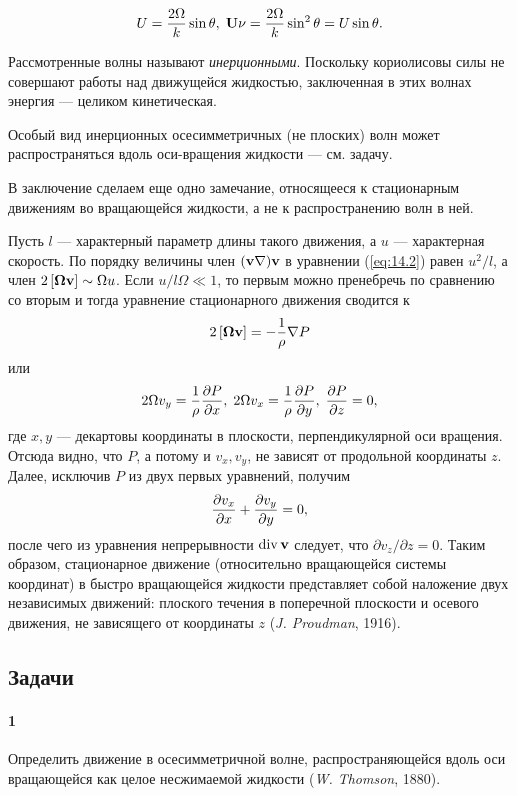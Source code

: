 \[
   U = \frac{2\Omega}{k}\sin\theta,\;
   \mathbf{U} \nu = \frac{2\Omega}{k}\sin^2\theta = U\sin\theta.
\]

Рассмотренные волны называют \textit{инерционными}. Поскольку кориолисовы силы
не совершают работы над движущейся жидкостью, заключенная в этих волнах энергия
— целиком кинетическая.

Особый вид инерционных осесимметричных (не плоских) волн может распространяться
вдоль оси-вращения жидкости — см. задачу.

В заключение сделаем еще одно замечание, относящееся к стационарным движениям во
вращающейся жидкости, а не к распространению волн в ней.

Пусть $l$ — характерный параметр длины такого движения, а $u$ — характерная
скорость. По порядку величины член $({\mathbf{v}} \nabla) {\mathbf{v}}$ в уравнении (\ref{eq:14.2}) равен $u^2/l$, а
член $2 \left\lbrack \bm\Omega{ \mathbf{v} } \right\rbrack \sim \Omega u$. Если
$u/l\Omega \ll 1$, то первым можно пренебречь по сравнению со вторым и тогда
уравнение стационарного движения сводится к
\begin{equation}
   \label{eq:14.10}
   2 \left\lbrack \bm\Omega{ \mathbf{v} } \right\rbrack = - \frac1{\rho}\nabla P
\end{equation}
или
\[
   2\Omega v_y = \frac1{\rho}\frac{\partial{P}}{\partial{x}},\;
   2\Omega v_x = \frac1{\rho}\frac{\partial{P}}{\partial{y}},\;
   \frac{\partial{P}}{\partial{z}} = 0,
\]
где $x,y$ — декартовы координаты в плоскости, перпендикулярной оси вращения.
Отсюда видно, что $P$, а потому и $v_x, v_y$, не зависят от продольной
координаты $z$. Далее, исключив $P$ из двух первых уравнений, получим
\[
   \frac{\partial{v_x}}{\partial{x}} + \frac{\partial{v_y}}{\partial{y}} = 0,
\]
после чего из уравнения непрерывности $\mathop{\mathrm{div}}\nolimits{ \mathbf{v} }$ следует, что $\partial
v_z/\partial z = 0$. Таким образом, стационарное движение (относительно
вращающейся системы координат) в быстро вращающейся жидкости представляет собой
наложение двух независимых движений: плоского течения в поперечной плоскости и
осевого движения, не зависящего от координаты $z$ (\textit{J. Proudman}, 1916).


\subsection*{Задачи}

\paragraph*{1}
Определить движение в осесимметричной волне, распространяющейся вдоль оси
вращающейся как целое несжимаемой жидкости (\textit{W. Thomson}, 1880).


